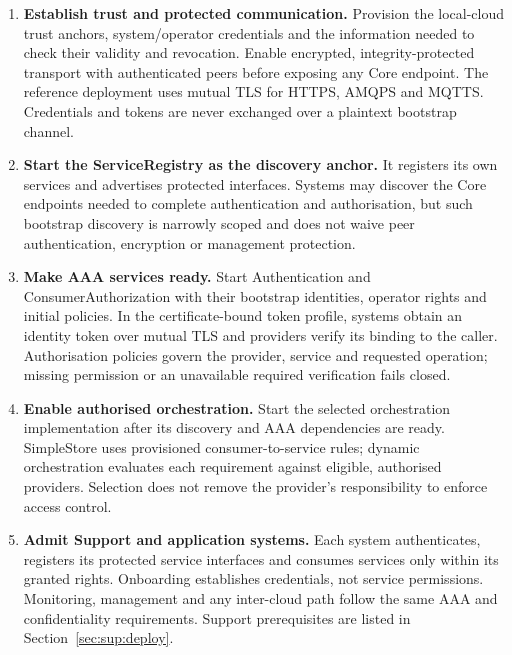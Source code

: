 \documentclass[a4paper]{arrowhead}
\begin{document}
\begin{enumerate}
  \item \textbf{Establish trust and protected communication.} Provision the local-cloud
        trust anchors, system/operator credentials and the information needed to check
        their validity and revocation. Enable encrypted, integrity-protected transport
        with authenticated peers before exposing any Core endpoint. The reference
        deployment uses mutual TLS for HTTPS, AMQPS and MQTTS. Credentials and tokens
        are never exchanged over a plaintext bootstrap channel.
  \item \textbf{Start the ServiceRegistry as the discovery anchor.} It registers its
        own services and advertises protected interfaces. Systems may discover the
        Core endpoints needed to complete authentication and authorisation, but such
        bootstrap discovery is narrowly scoped and does not waive peer authentication,
        encryption or management protection.
  \item \textbf{Make AAA services ready.} Start Authentication and
        ConsumerAuthorization with their bootstrap identities, operator rights and
        initial policies. In the certificate-bound token profile, systems obtain an
        identity token over mutual TLS and providers verify its binding to the caller.
        Authorisation policies govern the provider, service and requested operation;
        missing permission or an unavailable required verification fails closed.
  \item \textbf{Enable authorised orchestration.} Start the selected orchestration
        implementation after its discovery and AAA dependencies are ready. SimpleStore
        uses provisioned consumer-to-service rules; dynamic orchestration evaluates
        each requirement against eligible, authorised providers. Selection does not
        remove the provider's responsibility to enforce access control.
  \item \textbf{Admit Support and application systems.} Each system authenticates,
        registers its protected service interfaces and consumes services only within
        its granted rights. Onboarding establishes credentials, not service permissions.
        Monitoring, management and any inter-cloud path follow the same AAA and
        confidentiality requirements. Support prerequisites are listed in
        Section~\ref{sec:sup:deploy}.
\end{enumerate}
\end{document}
